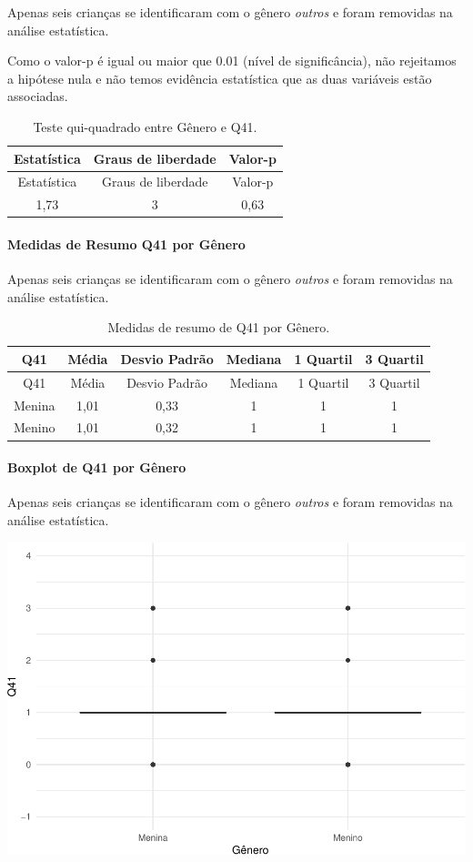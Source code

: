 \documentclass[]{article}
\let\oldparagraph\paragraph
\renewcommand{\paragraph}[1]{\oldparagraph{#1}\mbox{}}
\begin{document}
Apenas seis crianças se identificaram com o gênero \emph{outros} e foram removidas na análise estatística.

Como o valor-p é igual ou maior que 0.01 (nível de significância), não rejeitamos a hipótese nula e não temos evidência estatística que as duas variáveis estão associadas.

\begin{longtable}[]{@{}ccc@{}}
\caption{\label{tab:unnamed-chunk-1619}Teste qui-quadrado entre Gênero e Q41.}\tabularnewline
\toprule
Estatística & Graus de liberdade & Valor-p\tabularnewline
\midrule
\endfirsthead
\toprule
Estatística & Graus de liberdade & Valor-p\tabularnewline
\midrule
\endhead
1,73 & 3 & 0,63\tabularnewline
\bottomrule
\end{longtable}

\cleardoublepage

\hypertarget{medidas-de-resumo-q41-por-guxeanero}{%
\paragraph{Medidas de Resumo Q41 por Gênero}\label{medidas-de-resumo-q41-por-guxeanero}}

Apenas seis crianças se identificaram com o gênero \emph{outros} e foram removidas na análise estatística.

\begin{longtable}[]{@{}cccccc@{}}
\caption{\label{tab:unnamed-chunk-1620}Medidas de resumo de Q41 por Gênero.}\tabularnewline
\toprule
Q41 & Média & Desvio Padrão & Mediana & 1 Quartil & 3 Quartil\tabularnewline
\midrule
\endfirsthead
\toprule
Q41 & Média & Desvio Padrão & Mediana & 1 Quartil & 3 Quartil\tabularnewline
\midrule
\endhead
Menina & 1,01 & 0,33 & 1 & 1 & 1\tabularnewline
Menino & 1,01 & 0,32 & 1 & 1 & 1\tabularnewline
\bottomrule
\end{longtable}

\hypertarget{boxplot-de-q41-por-guxeanero}{%
\paragraph{Boxplot de Q41 por Gênero}\label{boxplot-de-q41-por-guxeanero}}

Apenas seis crianças se identificaram com o gênero \emph{outros} e foram removidas na análise estatística.

\begin{center}\includegraphics[width=0.75\linewidth]{relatorio_covid19_files/figure-latex/unnamed-chunk-1621-1} \end{center}
\end{document}
